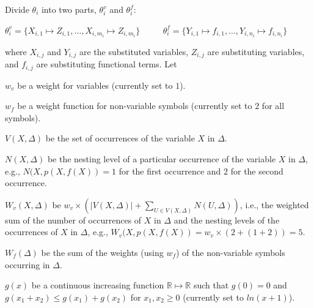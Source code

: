 \documentclass[EPiC]{easychair}
\newenvironment{packed_itemize}{
\vspace*{-0.5em}
\begin{itemize}
  \setlength{\partopsep}{0pt}
  \setlength{\itemsep}{1pt}
  \setlength{\parskip}{0pt}
  \setlength{\parsep}{0pt}
}{\end{itemize}}
\begin{document}
Divide $\theta_i$ into two parts, $\theta_i^v$ and $\theta_i^f$:
\begin{center}
$\theta_i^v=\{X_{i,1}\mapsto Z_{i,1},\dots,X_{i,m_i}\mapsto Z_{i,m_i}\}$
~~~~
$\theta_i^f=\{Y_{i,1}\mapsto f_{i,1},\dots,Y_{i,n_i}\mapsto f_{i,n_i}\}$
\end{center}
where $X_{i,j}$ and $Y_{i,j}$ are the substituted variables, 
$Z_{i,j}$ are substituting variables, and
$f_{i,j}$ are substituting functional terms.
Let
\begin{packed_itemize}
\item $w_v$ be a weight for variables (currently set to $1$).
\item $w_f$ be a weight function for non-variable symbols (currently
      set to $2$ for all symbols). 
\item $V(X,\Delta)$ be the set of occurrences of the variable $X$ in $\Delta$.
\item $N(X,\Delta)$ be the nesting level of a particular occurrence of the 
      variable $X$ in $\Delta$, e.g., $N(X,p(X,f(X)) = 1$ for the first 
      occurrence and $2$ for the second occurrence.
\item $W_v(X,\Delta)$ be 
      $w_v \times (|V(X,\Delta)| + \sum_{U \in V(X,\Delta)} N(U,\Delta))$,
      i.e., the weighted sum of the number of occurrences of $X$ in $\Delta$ 
      and the nesting levels of the occurrences of $X$ in $\Delta$, e.g., 
      $W_v(X,p(X,f(X)) = w_v \times (2 + (1+2)) = 5$.
\item $W_f(\Delta)$ be the sum of the weights (using $w_f$) of the 
      non-variable symbols occurring in $\Delta$.
\item $g(x)$ be a continuous increasing function 
      $\mathbb{R} \mapsto \mathbb{R}$ such that 
      $g(0)=0$
      and
      $g(x_1+x_2) \leq g(x_1)+ g(x_2)$ for $x_1, x_2\geq0$
      (currently set to $ln(x+1)$).
\end{packed_itemize}
\end{document}
